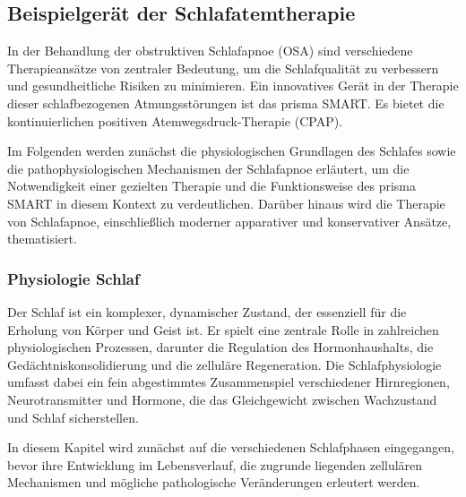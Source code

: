 \documentclass[a4paper, 12pt]{article}
\begin{document}
\newpage
\subsection{Beispielgerät der Schlafatemtherapie}\label{prismaSmart}
In der Behandlung der obstruktiven Schlafapnoe (OSA) sind verschiedene Therapieansätze von zentraler Bedeutung, um die Schlafqualität zu verbessern und gesundheitliche Risiken zu minimieren. Ein innovatives Gerät in der Therapie dieser schlafbezogenen Atmungsstörungen ist das prisma SMART. Es bietet die kontinuierlichen positiven Atemwegsdruck-Therapie (CPAP). 

Im Folgenden werden zunächst die physiologischen Grundlagen des Schlafes sowie die pathophysiologischen Mechanismen der Schlafapnoe erläutert, um die Notwendigkeit einer gezielten Therapie und die Funktionsweise des prisma SMART in diesem Kontext zu verdeutlichen. Darüber hinaus wird die Therapie von Schlafapnoe, einschließlich moderner apparativer und konservativer Ansätze, thematisiert.

\subsubsection{Physiologie Schlaf}
Der Schlaf ist ein komplexer, dynamischer Zustand, der essenziell für die Erholung von Körper und Geist ist. Er spielt eine zentrale Rolle in zahlreichen physiologischen Prozessen, darunter die Regulation des Hormonhaushalts, die Gedächtniskonsolidierung und die zelluläre Regeneration. Die Schlafphysiologie umfasst dabei ein fein abgestimmtes Zusammenspiel verschiedener Hirnregionen, Neurotransmitter und Hormone, die das Gleichgewicht zwischen Wachzustand und Schlaf sicherstellen.

In diesem Kapitel wird zunächst auf die verschiedenen Schlafphasen eingegangen, bevor ihre Entwicklung im Lebensverlauf, die zugrunde liegenden zellulären Mechanismen und mögliche pathologische Veränderungen erleutert werden.
\end{document}
